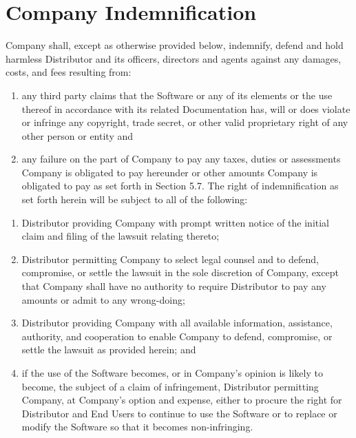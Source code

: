 \documentclass[letterpaper,10pt,english]{sphinxmanual}
\begin{document}
\section{Company Indemnification}
\label{\detokenize{indemnification:company-indemnification}}
Company shall, except as otherwise provided below, indemnify, defend and hold harmless Distributor and its officers, directors and agents against any damages, costs, and fees resulting from:
\begin{enumerate}
\item {} 
any third party claims that the Software or any of its elements or the use thereof in accordance with its related Documentation has, will or does violate or infringe any copyright, trade secret, or other valid  proprietary right of any other person or entity and

\item {} 
any failure on the part of Company to pay any taxes, duties or assessments Company is obligated to pay hereunder or other amounts Company is obligated to pay as set forth in Section 5.7. The right of indemnification as set forth herein will be subject to all of the following:

\end{enumerate}
\begin{enumerate}
\item {} 
Distributor providing Company with prompt written notice of the initial claim and filing of the lawsuit relating thereto;

\item {} 
Distributor permitting Company to select legal counsel and to defend, compromise, or settle the lawsuit in the sole discretion of Company, except that Company shall have no authority to require Distributor to pay any amounts or admit to any wrong-doing;

\item {} 
Distributor providing Company with all available information, assistance, authority, and cooperation to enable Company to defend, compromise, or settle the lawsuit as provided herein; and

\item {} 
if the use of the Software becomes, or in Company’s opinion is likely to become, the subject of a claim of infringement, Distributor permitting Company, at Company’s option and expense, either to procure the right for Distributor and End Users to continue to use the Software or to replace or modify the Software so that it becomes non-infringing.

\end{enumerate}
\end{document}
